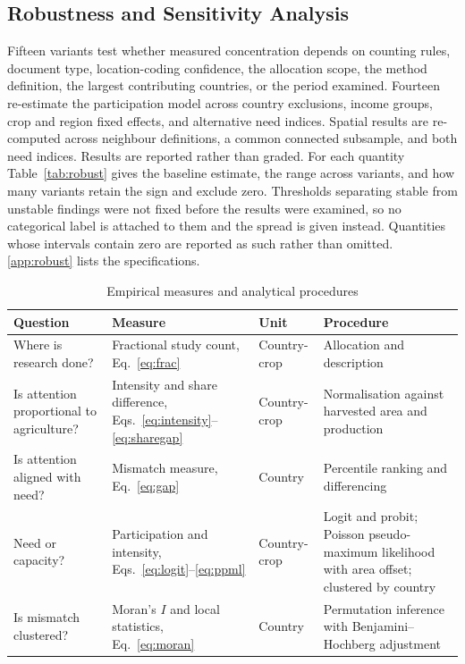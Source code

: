 \documentclass[ASNA,twocolumn]{USG}
\begin{document}
\subsection{Robustness and Sensitivity Analysis}

Fifteen variants test whether measured concentration depends on counting rules, document type,
location-coding confidence, the allocation scope, the method definition, the largest contributing
countries, or the period examined. Fourteen re-estimate the participation model across country
exclusions, income groups, crop and region fixed effects, and alternative need indices. Spatial
results are re-computed across neighbour definitions, a common connected subsample, and both need
indices. Results are reported rather than graded. For each quantity Table~\ref{tab:robust} gives the
baseline estimate, the range across variants, and how many variants retain the sign and exclude
zero. Thresholds separating stable from unstable findings were not fixed before the results were
examined, so no categorical label is attached to them and the spread is given instead. Quantities
whose intervals contain zero are reported as such rather than omitted.
\ref{app:robust} lists the specifications.

\begin{table}[!t]
\centering
\footnotesize
\setlength{\tabcolsep}{4pt}
\renewcommand{\arraystretch}{1.1}
\caption{Empirical measures and analytical procedures}
\label{tab:methods}
\begin{tabular}{@{}>{\raggedright\arraybackslash}p{3.6cm}
                  >{\raggedright\arraybackslash}p{4.3cm}
                  >{\raggedright\arraybackslash}p{1.9cm}
                  >{\raggedright\arraybackslash}p{4.7cm}@{}}
\toprule
Question & Measure & Unit & Procedure \\
\midrule
Where is research done? & Fractional study count, Eq.~\eqref{eq:frac} & Country-crop &
Allocation and description \\
Is attention proportional to agriculture? & Intensity and share difference,
Eqs.~\eqref{eq:intensity}--\eqref{eq:sharegap} & Country-crop &
Normalisation against harvested area and production \\
Is attention aligned with need? & Mismatch measure, Eq.~\eqref{eq:gap} & Country &
Percentile ranking and differencing \\
Need or capacity? & Participation and intensity,
Eqs.~\eqref{eq:logit}--\eqref{eq:ppml} & Country-crop &
Logit and probit; Poisson pseudo-maximum likelihood with area offset; clustered by country \\
Is mismatch clustered? & Moran's $I$ and local statistics, Eq.~\eqref{eq:moran} & Country &
Permutation inference with Benjamini--Hochberg adjustment \\
\bottomrule
\end{tabular}
\end{table}
\end{document}
